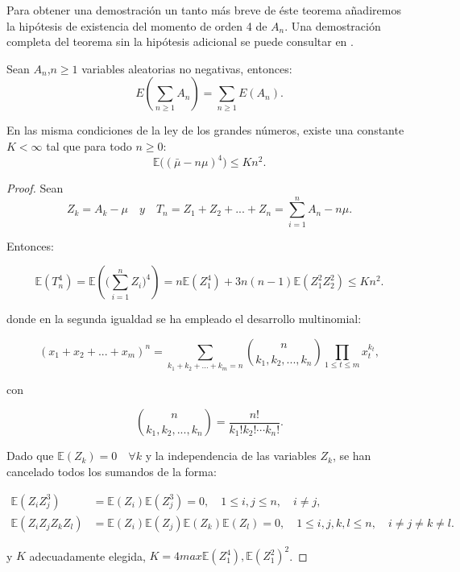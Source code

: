 \documentclass[../proyecto.tex]{memoir}
\begin{document}
Para obtener una demostración un tanto más breve de éste teorema añadiremos la hipótesis de existencia del momento de orden 4 de $A_n$. Una demostración completa del teorema sin la hipótesis adicional se puede consultar en \cite{elLibro}.

\begin{lema}  \label{intercambio_suma}
Sean $A_n$,$ n \geq 1$ variables aleatorias no negativas, entonces: $$
E \left( \sum_{n \geq 1} A_n \right) = \sum_{n \geq 1} E(A_n).
$$

\end{lema}

\begin{lema}
En las misma condiciones de la ley de los grandes números, existe una constante $ K < \infty $ tal que para todo $ n \geq 0$:
$$
\mathds{E} \big( ( \bar{ \mu } - n \mu ) ^ 4 \big) \leq K n^2.
$$
\end{lema}

\begin{proof}

Sean 
$$
Z_k = A_k - \mu \quad y \quad T_n = Z_1 + Z_2 + ... + Z_n = \sum_{i=1}^{n} A_n - n\mu. 
$$

Entonces:

$$
\mathds{E} ( T_{n}^{4} ) = \mathds{E} ( \big( \sum_{i=1}^{n} Z_i \big) ^{4} ) = n\mathds{E}(Z_{1}^4)+3n(n-1)\mathds{E}(Z_1^2 Z_2^2) \leq Kn^2.
$$

donde en la segunda igualdad se ha empleado el desarrollo multinomial:

$$
(x_1+x_2+...+x_m)^n = \sum_{k_1+k_2+...+k_m=n} { n \choose k_1,k_2, ..., k_n} \prod_{1 \leq t \leq m} x_t^{k_t},
$$

con

$$
{ n \choose k_1,k_2, ..., k_n} = \frac{n!}{k_1!k_2! \dotsb k_n!}.
$$

Dado que $\mathds{E}(Z_k)=0 \quad \forall k$ y la independencia de las variables $Z_k$, se han cancelado todos los sumandos de la forma:

\begin{align*}
	\mathds{E} (Z_{i} Z_{j}^3 ) &=\mathds{E} (Z_{i}) \mathds{E} (Z_{j}^3) = 0, \quad 1 \leq i,j \leq n, \quad i \neq j, \\
	\mathds{E} ( Z_{i} Z_{j} Z_{k} Z_{l} ) &= \mathds{E} (Z_{i}) \mathds{E} (Z_{j}) \mathds{E} (Z_{k}) \mathds{E} (Z_{l}) = 0, \quad 1 \leq i,j,k,l \leq n, \quad i \neq j \neq k \neq l.
\end{align*}

y $K$ adecuadamente elegida, $K = 4 max{\mathds{E}(Z_1^4), \mathds{E}(Z_1^2)^2}$.
\end{proof}
\end{document}
